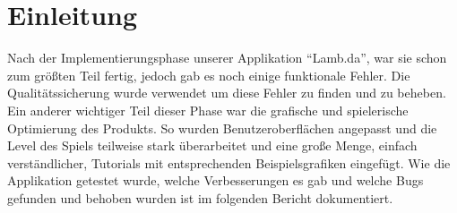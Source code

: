 \section{Einleitung}

Nach der Implementierungsphase unserer Applikation  "`Lamb.da"', war sie schon zum größten Teil fertig, jedoch gab es noch einige funktionale Fehler. Die Qualitätssicherung wurde verwendet um diese Fehler zu finden und zu beheben.
Ein anderer wichtiger Teil dieser Phase war die grafische und spielerische Optimierung des Produkts. So wurden Benutzeroberflächen angepasst und die Level des Spiels teilweise stark überarbeitet und eine große Menge, einfach verständlicher, Tutorials mit entsprechenden Beispielsgrafiken eingefügt.
Wie die Applikation getestet wurde, welche Verbesserungen es gab und welche Bugs gefunden und behoben wurden ist im folgenden Bericht dokumentiert.